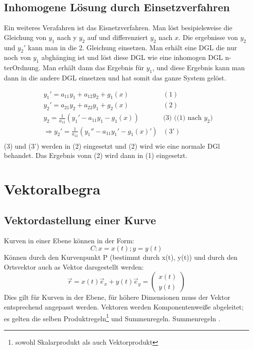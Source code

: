 \documentclass[a4paper,10pt]{scrartcl}
\begin{document}
        \subsection*{Inhomogene Lösung durch Einsetzverfahren}
            Ein weiteres Verafahren ist das Eisnetzverfahren. Man löst besipielsweise die Gleichung von \(y_1\) nach y
            \(y_2\) auf und differenziert \(y_2\) nach \(x\). Die ergebnisse von \(y_2\) und \(y_2'\) kann man in die 2. Gleichung einsetzen.
            Man erhält eine DGL die nur noch von \(y_1\) abghänging ist und löst diese DGL wie eine inhomogen DGL n-terOrdnung. Man 
            erhält dann das Ergebnis für \(y_1\), und diese Ergebnis kann man dann in die andere DGL einsetzen und hat somit das ganze System gelöst.
            
            \begin{equation*}
                \begin{aligned}
                    & y_1' = a_{11}y_1 + a_{12}y_2 + g_1(x) &  (1)\\
                    & y_2' = a_{21}y_2 + a_{22}y_1 + g_2(x) &  (2)\\
                    & y_2 = \frac{1}{a_{12}} (y_1' - a_{11}y_1 - g_1(x)) & \text{(3) ((1) nach  \(y_2\)) } \\
                    & \Rightarrow y_2' = \frac{1}{a_{12}} (y_1'' - a_{11}y_1' - g_1(x)') & (3') \\
                \end{aligned}
            \end{equation*}
            (3) und (3') werden in (2) eingesetzt und (2) wird wie eine normale DGl behandet. Das Ergebnis vonn (2) wird dann in (1) eingesetzt.
    
    \section{Vektoralbegra}
        \subsection{Vektordastellung einer Kurve}
        Kurven in einer Ebene können in der Form: 
        \begin{equation*}
            C: x = x(t); y = y(t)
        \end{equation*}
        Können durch den Kurvenpunkt P (bestimmt durch x(t), y(t)) und durch den Ortsvektor auch as Vektor darsgestellt werden:
        \begin{equation*}
            \vec{r} = x(t)\vec{e}_x + y(t)\vec{e}_y = \begin{pmatrix} x(t) \\ y(t) \end{pmatrix}
        \end{equation*}
        Dies gilt für Kurven in der Ebene, für höhere Dimensionen muss der Vektor entsprechend angepasst werden. Vektoren werden Komponentenweiße abgeleitet;
        es gelten die selben Produktregeln\footnote{sowohl Skalarprodukt als auch Vektorprodukt} und Summenregeln. 
        Summenregeln .
\end{document}
